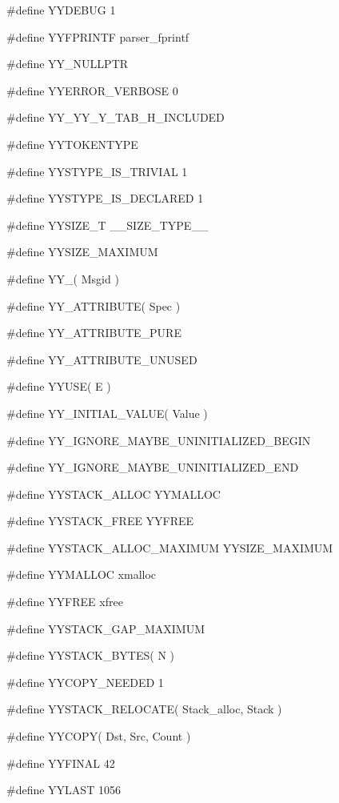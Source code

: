 \medskip
{\stt \#define YYDEBUG 1}

\medskip
{\stt \#define YYFPRINTF parser\_fprintf}

\medskip
{\stt \#define YY\_NULLPTR}

\medskip
{\stt \#define YYERROR\_VERBOSE 0}

\medskip
{\stt \#define YY\_YY\_Y\_TAB\_H\_INCLUDED}

\medskip
{\stt \#define YYTOKENTYPE}

\medskip
{\stt \#define YYSTYPE\_IS\_TRIVIAL 1}

\medskip
{\stt \#define YYSTYPE\_IS\_DECLARED 1}

\medskip
{\stt \#define YYSIZE\_T \_\_SIZE\_TYPE\_\_}

\medskip
{\stt \#define YYSIZE\_MAXIMUM}

\medskip
{\stt \#define YY\_( Msgid )}

\medskip
{\stt \#define YY\_ATTRIBUTE( Spec )}

\medskip
{\stt \#define YY\_ATTRIBUTE\_PURE}

\medskip
{\stt \#define YY\_ATTRIBUTE\_UNUSED}

\medskip
{\stt \#define YYUSE( E )}

\medskip
{\stt \#define YY\_INITIAL\_VALUE( Value )}

\medskip
{\stt \#define YY\_IGNORE\_MAYBE\_UNINITIALIZED\_BEGIN}

\medskip
{\stt \#define YY\_IGNORE\_MAYBE\_UNINITIALIZED\_END}

\medskip
{\stt \#define YYSTACK\_ALLOC YYMALLOC}

\medskip
{\stt \#define YYSTACK\_FREE YYFREE}

\medskip
{\stt \#define YYSTACK\_ALLOC\_MAXIMUM YYSIZE\_MAXIMUM}

\medskip
{\stt \#define YYMALLOC xmalloc}

\medskip
{\stt \#define YYFREE xfree}

\medskip
{\stt \#define YYSTACK\_GAP\_MAXIMUM}

\medskip
{\stt \#define YYSTACK\_BYTES( N )}

\medskip
{\stt \#define YYCOPY\_NEEDED 1}

\medskip
{\stt \#define YYSTACK\_RELOCATE( Stack\_alloc, Stack )}

\medskip
{\stt \#define YYCOPY( Dst, Src, Count )}

\medskip
{\stt \#define YYFINAL 42}

\medskip
{\stt \#define YYLAST 1056}

